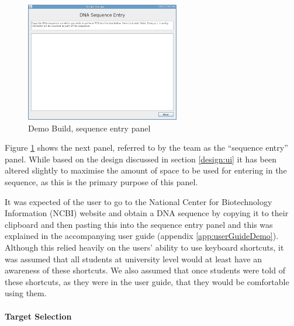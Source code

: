 \begin{figure}[h]
  \begin{center}
    \includegraphics[width=0.6\textwidth]{./images/demoBuild/sequenceEntry.png}
    \caption{
      \label{fig:demoBuild:sequenceEntry}
      Demo Build, sequence entry panel 
    }
  \end{center}
\end{figure}

Figure \ref{fig:demoBuild:sequenceEntry} shows the next panel,
referred to by the team as the ``sequence entry'' panel.
While based on the design discussed in section \ref{design:ui} it
has been altered slightly to maximise the amount of space to be used
for entering in the sequence, as this is the primary purpose of this
panel.

It was expected of the user to go to the National Center for
Biotechnology Information (NCBI) website and obtain a DNA sequence by
copying it to their clipboard and then pasting this into the sequence
entry panel and this was explained in the accompanying user guide
(appendix \ref{app:userGuideDemo}).
Although this relied heavily on the users' ability to use keyboard
shortcuts, it was assumed that all students at university level would
at least have an awareness of these shortcuts.
We also assumed that once students were told of these shortcuts, as
they were in the user guide, that they would be comfortable using
them.


\paragraph{Target Selection}

